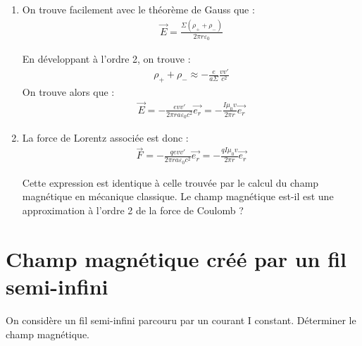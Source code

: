 \begin{correction}
\begin{enumerate}
	\item On trouve facilement avec le théorème de Gauss que :
	\begin{align*}
		\vec{E}=\frac{\Sigma(\rho_++\rho_-)}{2\pi r\varepsilon_0}
	\end{align*}
	
	 En développant à l'ordre 2, on trouve :
	\begin{align*}
		\rho_++\rho_-\approx -\frac{e}{a\Sigma}\frac{vv'}{c^2}
	\end{align*}
	On trouve alors que :
	\begin{align*}
		\vec{E}=-\frac{e vv'}{2\pi r a\varepsilon_0 c^2}\vec{e_r}=-\frac{I\mu_0 v}{2\pi r}\vec{e_r}
	\end{align*}
	
	\item
	La force de Lorentz associée est donc :
	\begin{align*}
		\vec{F}=-\frac{qe vv'}{2\pi r a\varepsilon_0 c^2}\vec{e_r}=-\frac{qI\mu_0 v}{2\pi r}\vec{e_r}
	\end{align*}
	
	Cette expression est identique à celle trouvée par le calcul du champ magnétique en mécanique classique. Le champ magnétique est-il est une approximation à l'ordre 2 de la force de Coulomb ? 
	\end{enumerate}

\end{correction}

\newpage

\section{Champ magnétique créé par un fil semi-infini}

On considère un fil semi-infini parcouru par un courant I constant. Déterminer le champ magnétique.

\newpage

